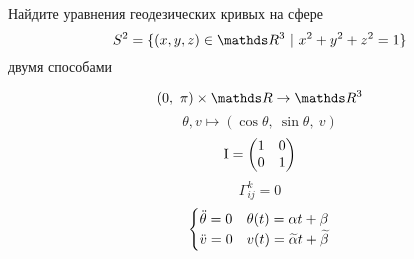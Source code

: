 \documentclass[main]{subfiles}
\begin{document}

    \begin{task}
        Найдите уравнения геодезических кривых на сфере
        \[S^2 = \{(x,y,z) \in \R^3 \ |\ x^2 + y^2 + z^2 = 1\}\]
        двумя способами
    \end{task}

    \begin{Remark}
        \[(0,\ \pi) \times \R \ra \R^3\]
        \[\theta, v \mapsto (\cos \theta,\ \sin \theta,\ v)\]
        \[\RNumb{1} = \begin{pmatrix}
            1 & 0\\
            0 & 1
        \end{pmatrix}\]
        \[\Gamma_{ij}^k = 0\]
        \[\begin{cases}
            \ddot{\theta} = 0 & \theta(t) = \alpha t + \beta\\
            \ddot{v} = 0 & v(t) = \widetilde{\alpha} t + \widetilde{\beta}
        \end{cases}\]
    \end{Remark}
\end{document}
